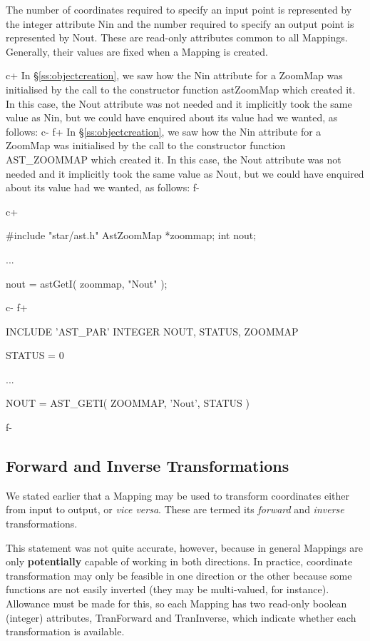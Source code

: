 \documentclass[twoside,11pt]{starlink}
\providecommand{\secref}[1]{\S\ref{#1}}
\begin{document}
The number of coordinates required to specify an input point is
represented by the integer attribute Nin and the number required to
specify an output point is represented by Nout. These are read-only
attributes common to all Mappings. Generally, their values are fixed
when a Mapping is created.

c+
In \secref{ss:objectcreation}, we saw how the Nin attribute for a
ZoomMap was initialised by the call to the constructor function
astZoomMap which created it. In this case, the Nout attribute was not
needed and it implicitly took the same value as Nin, but we could
have enquired about its value had we wanted, as follows:
c-
f+
In \secref{ss:objectcreation}, we saw how the Nin attribute for a
ZoomMap was initialised by the call to the constructor function
AST\_ZOOMMAP which created it. In this case, the Nout attribute was
not needed and it implicitly took the same value as Nout, but we could
have enquired about its value had we wanted, as follows:
f-

c+
\small
\begin{terminalv}
#include "star/ast.h"
AstZoomMap *zoommap;
int nout;

...

nout = astGetI( zoommap, "Nout" );
\end{terminalv}
\normalsize
c-
f+
\small
\begin{terminalv}
      INCLUDE 'AST_PAR'
      INTEGER NOUT, STATUS, ZOOMMAP

      STATUS = 0

      ...

      NOUT = AST_GETI( ZOOMMAP, 'Nout', STATUS )
\end{terminalv}
\normalsize
f-

\subsection{Forward and Inverse Transformations}

We stated earlier that a Mapping may be used to transform coordinates
either from input to output, or \emph{vice versa}. These are termed
its \emph{forward} and \emph{inverse} transformations.

This statement was not quite accurate, however, because in general
Mappings are only \textbf{potentially} capable of working in both
directions. In practice, coordinate transformation may only be
feasible in one direction or the other because some functions are not
easily inverted (they may be multi-valued, for instance). Allowance
must be made for this, so each Mapping has two read-only boolean
(integer) attributes, TranForward and TranInverse, which indicate
whether each transformation is available.
\end{document}
